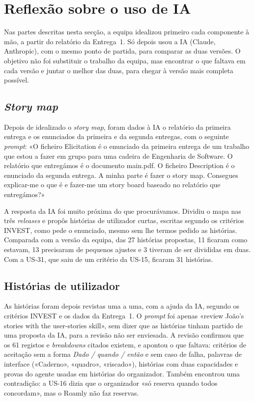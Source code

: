 \section{Reflexão sobre o uso de IA}\label{sec:reflexao}

Nas partes descritas nesta secção, a equipa idealizou primeiro cada componente à mão, a partir do relatório da Entrega~1.
Só depois usou a IA (Claude, Anthropic), com o mesmo ponto de partida, para comparar as duas versões. O objetivo não
foi substituir o trabalho da equipa, mas encontrar o que faltava em cada versão e juntar o melhor das duas, para chegar à
versão mais completa possível.

\subsection{\textit{Story map}}

Depois de idealizado o \textit{story map}, foram dados à IA o relatório da primeira entrega e os enunciados da primeira e da
segunda entregas, com o seguinte \textit{prompt}: «O ficheiro Elicitation é o enunciado da primeira entrega de um trabalho que
estou a fazer em grupo para uma cadeira de Engenharia de Software. O relatório que entregámos é o documento main.pdf. O
ficheiro Description é o enunciado da segunda entrega. A minha parte é fazer o story map. Consegues explicar-me o que é e
fazer-me um story board baseado no relatório que entregámos?»

A resposta da IA foi muito próxima do que procurávamos. Dividiu o mapa nas três \textit{releases} e propôs histórias de
utilizador curtas, escritas segundo os critérios INVEST, como pede o enunciado, mesmo sem lhe termos pedido as histórias.
Comparada com a versão da equipa, das 27 histórias propostas, 11 ficaram como estavam, 13 precisaram de pequenos ajustes e 3
tiveram de ser divididas em duas. Com a US-31, que saiu de um critério da US-15, ficaram 31 histórias.

\subsection{Histórias de utilizador}

As histórias foram depois revistas uma a uma, com a ajuda da IA, segundo os critérios INVEST e os dados da Entrega~1.
O \textit{prompt} foi apenas «review João's stories with the user-stories skill», sem dizer que as histórias tinham partido
de uma proposta da IA, para a revisão não ser enviesada. A revisão confirmou que os 61 registos e \textit{breakdowns} citados
existem, e apontou o que faltava: critérios de aceitação sem a forma \textit{Dado / quando / então} e sem caso de falha,
palavras de interface («Caderno», «quadro», «riscado»), histórias com duas capacidades e provas do agente usadas em histórias
do organizador. Também encontrou uma contradição: a US-16 dizia que o organizador «só reserva quando todos concordam», mas o
Roamly não faz reservas.

